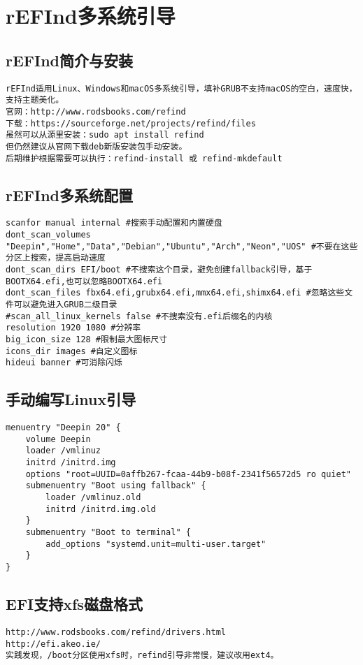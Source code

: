\documentclass[a4paper,fontset=fandol,zihao=-4,linespread=1.2]{ctexbook}
\begin{document}
\section{rEFInd多系统引导}
\subsection{rEFInd简介与安装}
\begin{lstlisting}
rEFInd适用Linux、Windows和macOS多系统引导，填补GRUB不支持macOS的空白，速度快，支持主题美化。
官网：http://www.rodsbooks.com/refind
下载：https://sourceforge.net/projects/refind/files
虽然可以从源里安装：sudo apt install refind
但仍然建议从官网下载deb新版安装包手动安装。
后期维护根据需要可以执行：refind-install 或 refind-mkdefault
\end{lstlisting}

\subsection{rEFInd多系统配置}
\begin{lstlisting}
scanfor manual internal #搜索手动配置和内置硬盘
dont_scan_volumes "Deepin","Home","Data","Debian","Ubuntu","Arch","Neon","UOS" #不要在这些分区上搜索，提高启动速度
dont_scan_dirs EFI/boot #不搜索这个目录，避免创建fallback引导，基于BOOTX64.efi,也可以忽略BOOTX64.efi
dont_scan_files fbx64.efi,grubx64.efi,mmx64.efi,shimx64.efi #忽略这些文件可以避免进入GRUB二级目录
#scan_all_linux_kernels false #不搜索没有.efi后缀名的内核
resolution 1920 1080 #分辨率
big_icon_size 128 #限制最大图标尺寸
icons_dir images #自定义图标
hideui banner #可消除闪烁
\end{lstlisting}

\subsection{手动编写Linux引导}
\begin{lstlisting}
menuentry "Deepin 20" {
    volume Deepin
    loader /vmlinuz
    initrd /initrd.img
    options "root=UUID=0affb267-fcaa-44b9-b08f-2341f56572d5 ro quiet"
    submenuentry "Boot using fallback" {
        loader /vmlinuz.old
        initrd /initrd.img.old
    }
    submenuentry "Boot to terminal" {
        add_options "systemd.unit=multi-user.target"
    }
}
\end{lstlisting}

\subsection{EFI支持xfs磁盘格式}
\begin{lstlisting}
http://www.rodsbooks.com/refind/drivers.html
http://efi.akeo.ie/
实践发现，/boot分区使用xfs时，refind引导非常慢，建议改用ext4。
\end{lstlisting}
\end{document}
